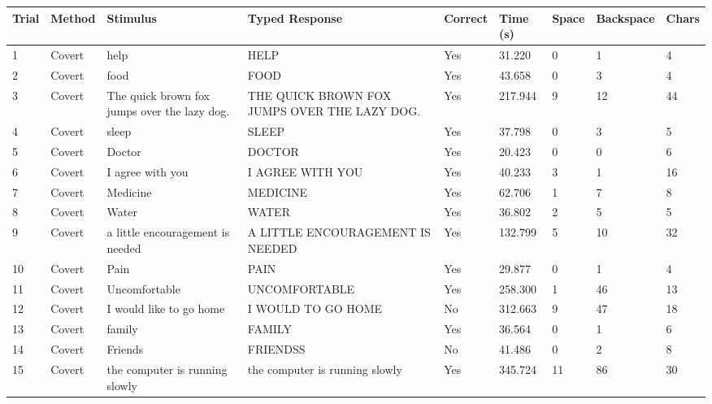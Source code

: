 \documentclass[10pt,a4paper]{article}
\begin{document}
\begin{center}
\begin{tabularx}{\textwidth}{
    C{0.45in}
    C{0.65in}
    L{2.35in}
    L{2.55in}
    C{0.65in}
    C{0.65in}
    C{0.55in}
    C{0.75in}
    C{0.55in}
}
\toprule

\textbf{Trial} &
\textbf{Method} &
\textbf{Stimulus} &
\textbf{Typed Response} &
\textbf{Correct} &
\textbf{Time (s)} &
\textbf{Space} &
\textbf{Backspace} &
\textbf{Chars}
\\

\midrule

1 &
Covert &
help &
HELP &
Yes &
31.220 &
0 &
1 &
4
\\

2 &
Covert &
food &
FOOD &
Yes &
43.658 &
0 &
3 &
4
\\

3 &
Covert &
The quick brown fox jumps over the lazy dog. &
THE QUICK BROWN FOX JUMPS OVER THE LAZY DOG. &
Yes &
217.944 &
9 &
12 &
44
\\

4 &
Covert &
sleep &
SLEEP &
Yes &
37.798 &
0 &
3 &
5
\\

5 &
Covert &
Doctor &
DOCTOR &
Yes &
20.423 &
0 &
0 &
6
\\

6 &
Covert &
I agree with you &
I AGREE WITH YOU &
Yes &
40.233 &
3 &
1 &
16
\\

7 &
Covert &
Medicine &
MEDICINE &
Yes &
62.706 &
1 &
7 &
8
\\

8 &
Covert &
Water &
WATER &
Yes &
36.802 &
2 &
5 &
5
\\

9 &
Covert &
a little encouragement is needed &
A LITTLE ENCOURAGEMENT IS NEEDED &
Yes &
132.799 &
5 &
10 &
32
\\

10 &
Covert &
Pain &
PAIN &
Yes &
29.877 &
0 &
1 &
4
\\

11 &
Covert &
Uncomfortable &
UNCOMFORTABLE &
Yes &
258.300 &
1 &
46 &
13
\\

12 &
Covert &
I would like to go home &
I WOULD TO GO HOME &
No &
312.663 &
9 &
47 &
18
\\

13 &
Covert &
family &
FAMILY &
Yes &
36.564 &
0 &
1 &
6
\\

14 &
Covert &
Friends &
FRIENDSS &
No &
41.486 &
0 &
2 &
8
\\

15 &
Covert &
the computer is running slowly &
the computer is running slowly &
Yes &
345.724 &
11 &
86 &
30
\\

\bottomrule
\end{tabularx}
\end{center}
\end{document}
